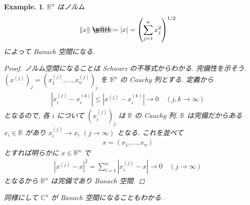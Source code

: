 \documentclass[openany, a4paper, oneside]{jsbook}
\makeatletter
\newcommand*{\defeq}{\mathrel{\rlap{%
\raisebox{0.3ex}{$\m@th\cdot$}}%
\raisebox{-0.3ex}{$\m@th\cdot$}}%
=}
\theoremstyle{break}
\theoremstyle{breakdefn}
\newtheorem{ex}[thm]{Example.}
\newcommand{\abs}[1]{\left|#1\right|}
\newcommand{\norm}[1]{\left\Vert#1\right\Vert}
\newcommand{\rbk}[1]{\left (#1\right)}
\newcommand{\bbR}{\mathbb{R}}
\newcommand{\bbRn}{\mathbb{R}^n}
\makeatother
\begin{document}
\begin{ex}
$\mathbb{R}^n$ はノルム
\begin{align}
 \norm{x}
 \defeq
 \abs{x}
 =
 \rbk{\sum_{j=1}^n x_j^2}^{1/2}
\end{align}
によって Banach 空間になる.

\begin{proof}
ノルム空間になることは Schwarz の不等式からわかる.
完備性を示そう.
$(x^{(j)})_j = (x_1^{(j)}, \dots, x_n^{(j)})_j$ を $\bbRn$ の Cauchy 列とする.
定義から
\begin{align}
 \abs{x_i^{(j)} - x_i^{(k)}}
 \leq
 \abs{x^{(j)} - x_i^{(k)}} \to 0 \quad (j, k \to \infty)
\end{align}
となるので, 各 $i$ について $(x_i^{(j)})_j$ は $\bbR$ の Cauchy 列.
$\bbR$ は完備だからある $x_i \in \bbR$ があり $x_i^{(j)} \to x_i$ $(j \to \infty)$ となる.
これを並べて
\begin{align}
 x
 =
 (x_1, \dots, x_n)
\end{align}
とすれば明らかに $x \in \bbR^n$ で
\begin{align}
 \abs{x^{(j)} - x}^2
 =
 \sum_{i=1}^n \abs{x_i^{(j)} - x} \to 0 \quad (j \to \infty)
\end{align}
となるから $\bbR^n$ は完備であり Banach 空間.
\end{proof}

同様にして $\mathbb{C}^n$ が Banach 空間になることもわかる.
\end{ex}
\end{document}
